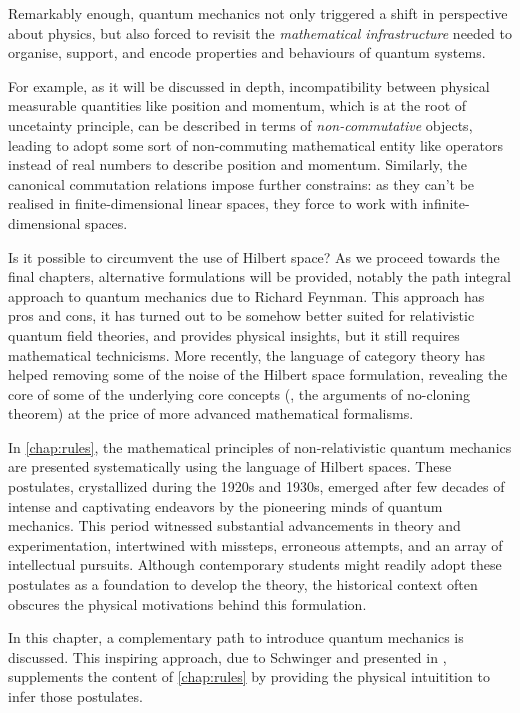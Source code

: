 \begin{refsection}
  Remarkably enough, quantum mechanics not only triggered a shift in perspective about physics, but also forced to revisit the \emph{mathematical infrastructure} needed to organise, support, and encode properties and behaviours of quantum systems.


For example, as it will be discussed in depth, incompatibility between physical measurable quantities like position and
momentum, which is at the root of uncetainty principle, can be described in
terms of \emph{non-commutative} objects, leading to adopt some sort of non-commuting mathematical entity like 
operators instead of real numbers to describe position and momentum.
Similarly, 
  the canonical commutation relations impose further
constrains: as they can't be realised in finite-dimensional linear spaces,
  they force to work with infinite-dimensional spaces. 

Is it possible to circumvent the use of Hilbert space?
As we proceed towards the final chapters,
  alternative formulations will be provided, notably
  the path integral approach to quantum mechanics due to Richard Feynman. This approach has pros and cons, it has turned out to be somehow better suited for relativistic quantum field theories, and provides physical insights, but it still requires mathematical technicisms. More recently, the language of category theory has helped removing some of the noise of the Hilbert space formulation, revealing the core of some of the underlying core concepts (\eg, the arguments of no-cloning theorem) at the price of more advanced mathematical formalisms.

  In \cref{chap:rules}, the mathematical principles of non-relativistic quantum mechanics are presented systematically using the language of Hilbert spaces. These postulates, crystallized during the 1920s and 1930s, emerged after few decades of intense and captivating endeavors by the pioneering minds of quantum mechanics. This period witnessed substantial advancements in theory and experimentation, intertwined with missteps, erroneous attempts, and an array of intellectual pursuits. Although contemporary students might readily adopt these postulates as a foundation to develop the theory, the historical context often obscures the physical motivations behind this formulation.

  In this chapter, a complementary path to introduce quantum mechanics is discussed.
  This inspiring approach, due to Schwinger and presented in \textcite[\S~1]{Schwinger:2001}, 
  supplements the content of \cref{chap:rules} by providing the physical intuitition to infer those postulates.


\end{refsection}
